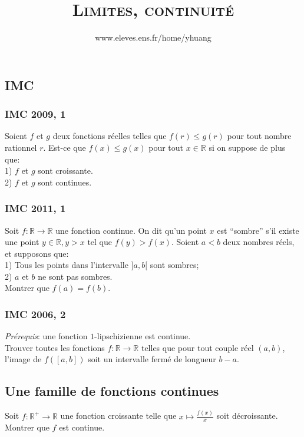 \documentclass{article}
\begin{document}
\setcounter{section}{15}

\title{\textsc{Limites, continuit\'e}}
\author{www.eleves.ens.fr/home/yhuang}
\date{}
\maketitle

\subsection{IMC}
\subsubsection{IMC 2009, 1}
Soient $f$ et $g$ deux fonctions r\'eelles telles que $f(r)\leq g(r)$ pour tout nombre rationnel $r$. Est-ce que $f(x)\leq g(x)$ pour tout $x\in\mathbb{R}$ si on suppose de plus que:\\
1) $f$ et $g$ sont croissante.\\
2) $f$ et $g$ sont continues.

\subsubsection{IMC 2011, 1}
Soit $f:\mathbb{R}\to\mathbb{R}$ une fonction continue. On dit qu'un point $x$ est ``sombre'' s'il existe une point $y\in\mathbb{R}, y>x$ tel que $f(y)>f(x)$. Soient $a<b$ deux nombres r\'eels, et supposons que:\\
1) Tous les points dans l'intervalle $]a,b[$ sont sombres;\\
2) $a$ et $b$ ne sont pas sombres.\\
Montrer que $f(a)=f(b)$.

\subsubsection{IMC 2006, 2}
\emph{Pr\'erequis}: une fonction $1$-lipschizienne est continue.\\
Trouver toutes les fonctions $f:\mathbb{R}\to\mathbb{R}$ telles que pour tout couple r\'eel $(a,b)$, l'image de $f([a,b])$ soit un intervalle ferm\'e de longueur $b-a$.

\subsection{Une famille de fonctions continues}
Soit $f:\mathbb{R}^+\to\mathbb{R}$ une fonction croissante telle que $x\mapsto\frac{f(x)}{x}$ soit d\'ecroissante. Montrer que $f$ est continue.
\end{document}
